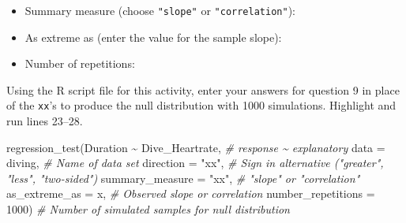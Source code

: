 \documentclass[
]{report}
\newenvironment{Shaded}{\begin{snugshade}}{\end{snugshade}}
\newcommand{\AttributeTok}[1]{\textcolor[rgb]{0.77,0.63,0.00}{#1}}
\newcommand{\CommentTok}[1]{\textcolor[rgb]{0.56,0.35,0.01}{\textit{#1}}}
\newcommand{\DecValTok}[1]{\textcolor[rgb]{0.00,0.00,0.81}{#1}}
\newcommand{\FunctionTok}[1]{\textcolor[rgb]{0.00,0.00,0.00}{#1}}
\newcommand{\NormalTok}[1]{#1}
\newcommand{\SpecialCharTok}[1]{\textcolor[rgb]{0.00,0.00,0.00}{#1}}
\newcommand{\StringTok}[1]{\textcolor[rgb]{0.31,0.60,0.02}{#1}}
\providecommand{\tightlist}{%
  \setlength{\itemsep}{0pt}\setlength{\parskip}{0pt}}
\begin{document}
\begin{itemize}
\tightlist
\item
  Summary measure (choose \texttt{"slope"} or \texttt{"correlation"}):
\end{itemize}

\vspace{.2in}

\begin{itemize}
\tightlist
\item
  As extreme as (enter the value for the sample slope):
\end{itemize}

\vspace{0.2in}

\begin{itemize}
\tightlist
\item
  Number of repetitions:
\end{itemize}

\vspace{.2in}

Using the R script file for this activity, enter your answers for question 9 in place of the \texttt{xx}'s to produce the null distribution with 1000 simulations. Highlight and run lines 23--28.

\begin{Shaded}
\begin{Highlighting}[]
\FunctionTok{regression\_test}\NormalTok{(Duration }\SpecialCharTok{\textasciitilde{}}\NormalTok{ Dive\_Heartrate, }\CommentTok{\# response \textasciitilde{} explanatory}
               \AttributeTok{data =}\NormalTok{ diving, }\CommentTok{\# Name of data set}
               \AttributeTok{direction =} \StringTok{"xx"}\NormalTok{, }\CommentTok{\# Sign in alternative ("greater", "less", "two{-}sided")}
               \AttributeTok{summary\_measure =} \StringTok{"xx"}\NormalTok{, }\CommentTok{\# "slope" or "correlation"}
               \AttributeTok{as\_extreme\_as =}\NormalTok{ x, }\CommentTok{\# Observed slope or correlation}
               \AttributeTok{number\_repetitions =} \DecValTok{1000}\NormalTok{) }\CommentTok{\# Number of simulated samples for null distribution}
\end{Highlighting}
\end{Shaded}
\end{document}
